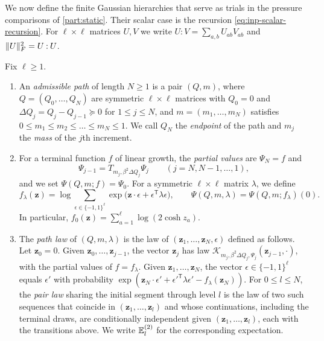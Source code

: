 We now define the finite Gaussian hierarchies that serve as trials in the
pressure comparisons of \cref{part:static}. Their scalar case is the recursion
\eqref{eq:inp-scalar-recursion}. For $\ell\times\ell$ matrices $U,V$ we write
$U\mathbin{:}V=\sum_{a,b}U_{ab}V_{ab}$ and $\lVert U\rVert_F^2=U\mathbin{:}U$.

\begin{definition}\label{def:inp-hierarchy}
Fix $\ell\ge1$.
\begin{enumerate}[label=\textup{(\alph*)}]
\item An \emph{admissible path} of length $N\ge1$ is a pair $(Q,m)$, where
 $Q=(Q_0,\dots,Q_N)$ are symmetric $\ell\times\ell$ matrices with $Q_0=0$ and
 $\Delta Q_j=Q_j-Q_{j-1}\succeq0$ for $1\le j\le N$, and $m=(m_1,\dots,m_N)$
 satisfies $0\le m_1\le m_2\le\dots\le m_N\le1$. We call $Q_N$ the
 \emph{endpoint} of the path and $m_j$ the \emph{mass} of the $j$th increment.
\item For a terminal function $f$ of linear growth, the \emph{partial values} are
 $\Psi_N=f$ and
 \begin{equation}\label{eq:inp-hierarchy-recursion}
  \Psi_{j-1}=T_{m_j,\beta^2\Delta Q_j}\Psi_j\qquad(j=N,N-1,\dots,1),
 \end{equation}
 and we set $\Psi(Q,m;f)=\Psi_0$. For a symmetric $\ell\times\ell$ matrix
 $\lambda$, we define
 \[
  f_\lambda(\mathbf z)=\log\sum_{\epsilon\in\{-1,1\}^\ell}
  \exp\bigl(\mathbf z\cdot\epsilon+\epsilon^{\mathsf T}\lambda\epsilon\bigr),
  \qquad
  \Psi(Q,m,\lambda)=\Psi(Q,m;f_\lambda)(0).
 \]
 In particular, $f_0(\mathbf z)=\sum_{a=1}^\ell\log(2\cosh z_a)$.
\item The \emph{path law} of $(Q,m,\lambda)$ is the law of
 $(\mathbf z_1,\dots,\mathbf z_N,\epsilon)$ defined as follows. Let $\mathbf
 z_0=0$. Given $\mathbf z_0,\dots,\mathbf z_{j-1}$, the vector $\mathbf z_j$ has
 law $\mathcal K_{m_j,\beta^2\Delta Q_j,\Psi_j}(\mathbf z_{j-1},\cdot)$, with
 the partial values of $f=f_\lambda$. Given $\mathbf z_1,\dots,\mathbf z_N$,
 the vector $\epsilon\in\{-1,1\}^\ell$ equals $\epsilon'$ with probability
 $\exp(\mathbf z_N\cdot\epsilon'+\epsilon'^{\mathsf T}\lambda\epsilon'-f_\lambda(\mathbf z_N))$.
 For $0\le l\le N$, the \emph{pair law} sharing the initial segment through level $l$ is
 the law of two such sequences that coincide in $(\mathbf z_1,\dots,\mathbf z_l)$
 and whose continuations, including the terminal draws, are conditionally
 independent given $(\mathbf z_1,\dots,\mathbf z_l)$, each with the
 transitions above. We write $\mathbb E_l^{(2)}$ for the corresponding expectation.
\end{enumerate}
\end{definition}

